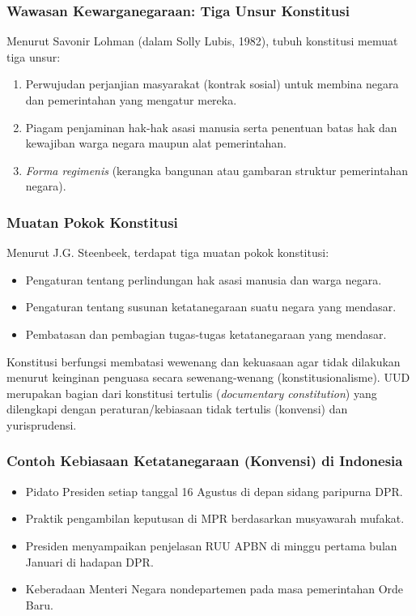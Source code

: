 \subsubsection{Wawasan Kewarganegaraan: Tiga Unsur Konstitusi}
Menurut Savonir Lohman (dalam Solly Lubis, 1982), tubuh konstitusi memuat tiga unsur:
\begin{enumerate}
    \item Perwujudan perjanjian masyarakat (kontrak sosial) untuk membina negara dan pemerintahan yang mengatur mereka.
    \item Piagam penjaminan hak-hak asasi manusia serta penentuan batas hak dan kewajiban warga negara maupun alat pemerintahan.
    \item \textit{Forma regimenis} (kerangka bangunan atau gambaran struktur pemerintahan negara).
\end{enumerate}

\subsubsection{Muatan Pokok Konstitusi}
Menurut J.G. Steenbeek, terdapat tiga muatan pokok konstitusi:
\begin{itemize}
    \item Pengaturan tentang perlindungan hak asasi manusia dan warga negara.
    \item Pengaturan tentang susunan ketatanegaraan suatu negara yang mendasar.
    \item Pembatasan dan pembagian tugas-tugas ketatanegaraan yang mendasar.
\end{itemize}

Konstitusi berfungsi membatasi wewenang dan kekuasaan agar tidak dilakukan menurut keinginan penguasa secara sewenang-wenang (konstitusionalisme). UUD merupakan bagian dari konstitusi tertulis (\textit{documentary constitution}) yang dilengkapi dengan peraturan/kebiasaan tidak tertulis (konvensi) dan yurisprudensi.

\subsubsection{Contoh Kebiasaan Ketatanegaraan (Konvensi) di Indonesia}
\begin{itemize}
    \item Pidato Presiden setiap tanggal 16 Agustus di depan sidang paripurna DPR.
    \item Praktik pengambilan keputusan di MPR berdasarkan musyawarah mufakat.
    \item Presiden menyampaikan penjelasan RUU APBN di minggu pertama bulan Januari di hadapan DPR.
    \item Keberadaan Menteri Negara nondepartemen pada masa pemerintahan Orde Baru.
\end{itemize}

